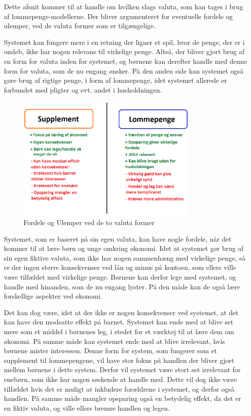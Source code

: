 Dette afsnit kommer til at handle om hvilken slags valuta, som kan tages i brug af lommepenge-modellerne. Der bliver argumenteret for eventuelle fordele og ulemper, ved de valuta former som er tilgængelige.

Systemet kan fungere mere i en retning der ligner et spil, hvor de penge, der er i omløb, ikke har nogen relevans til virkelige penge. Altså, der bliver gjort brug af en form for valuta inden for systemet, og børnene kan derefter handle med denne form for valuta, som de nu engang ønsker. På den anden side kan systemet også gøre brug af rigtige penge, i form af lommepenge, idet systemet allerede er forbundet med pligter og evt. andet i husholdningen.

\begin{figure}[htb]
\centering
\includegraphics[width=0.8\textwidth]{Billeder/supplomme.png}
\caption{Fordele og Ulemper ved de to valuta former}
\label{SuppLomme}
\end{figure}

Systemet, som er baseret på sin egen valuta, kan have nogle fordele, når det kommer til at lære børn og unge omkring økonomi. Idet at systemet gør brug af sin egen fiktive valuta, som ikke har nogen sammenhæng med virkelige penge, så er der ingen større konsekvenser ved lån og minus på kontoen, som ellers ville være tilfældet med virkelige penge. Børnene kan derfor lege med systemet, og handle med hinanden, som de nu engang lyster. På den måde kan de også lære forskellige aspekter ved økonomi.

Det kan dog være, idet at der ikke er nogen konsekvenser ved systemet, at det kan have den modsatte effekt på barnet.  Systemet kan ende med at blive set mere som et middel i børnenes leg, i stedet for et værktøj til at lære dem om økonomi. På samme måde kan systemet ende med at blive irrelevant, hvis børnene mister interessen. Denne form for system, som fungerer som et supplement til lommepengene, vil have stor fokus på handlen der bliver gjort mellem børnene i dette system. Derfor vil systemet være stort set irrelevant for enebørn, som ikke har nogen søskende at handle med. Dette vil dog ikke være tilfældet hvis det er muligt at inkludere forældrene i systemet, og derfor også handlen. På samme måde mangler opsparing også en betydelig effekt, da det er en fiktiv valuta, og ville ellers bremse handlen og legen.
 
